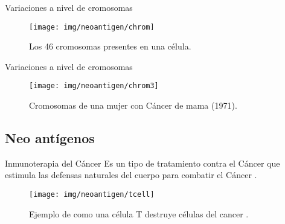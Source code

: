 \documentclass[10pt]{beamer}
\newcommand{\1}{
	\setbeamertemplate{background}{
		\texttt{[image: img/1]}
		\tikz[overlay] \fill[fill opacity=0.75,fill=white] (0,0) rectangle (-\paperwidth,\paperheight);
	}
}
\begin{document}
\begin{frame}{Variaciones a nivel de cromosomas}{}
	\begin{figure}
		\centering
		\texttt{[image: img/neoantigen/chrom]}
		\caption{Los 46 cromosomas presentes en una célula.}
	\end{figure}		
\end{frame}

\begin{frame}{Variaciones a nivel de cromosomas}{}
	\begin{figure}
		\centering
		\texttt{[image: img/neoantigen/chrom3]}
		\caption{Cromosomas de una mujer con Cáncer de mama (1971).}
	\end{figure}		
\end{frame}

\subsection{Neo antígenos}

\begin{frame}{Inmunoterapia del Cáncer}{}		
	Es un tipo de tratamiento contra el Cáncer que estimula las defensas naturales del cuerpo para combatir el Cáncer \cite{inmunoterapy2022}.
		
	\begin{figure}
		\texttt{[image: img/neoantigen/tcell]}
		\caption{Ejemplo de como una célula T destruye células del cancer \cite{nortshore2022}.}
	\end{figure}		
\end{frame}
\end{document}
